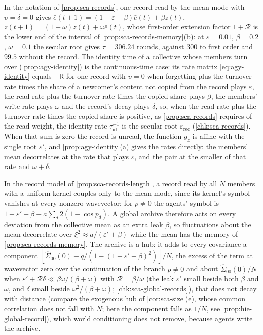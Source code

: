 \begin{remark}\label{rem:sca-records-special}
In the notation of \cref{prop:sca-records}, one record read by the mean mode with $\upsilon=\delta=0$ gives $\bar e(t+1)=(1-\varepsilon-\beta)\bar e(t)+\beta z(t)$, $z(t+1)=(1-\omega)z(t)+\omega\bar e(t)$, whose first-order extension factor $1+\mathcal R$ is the lower end of the interval of \cref{prop:sca-records-memory}(b): at $\varepsilon=0.01$, $\beta=0.2$, $\omega=0.1$ the secular root gives $\tau=306.24$ rounds, against $300$ to first order and $99.5$ without the record. The identity time of a collective whose members turn over (\cref{prop:agy-identity}) is the continuous-time case: its rate matrix \eqref{eq:agy-identity} equals $-\mathsf R$ for one record with $\upsilon=0$ when forgetting plus the turnover rate times the share of a newcomer's content not copied from the record plays $\varepsilon$, the read rate plus the turnover rate times the copied share plays $\beta$, the members' write rate plays $\omega$ and the record's decay plays $\delta$, so, when the read rate plus the turnover rate times the copied share is positive, as \cref{prop:sca-records} requires of the read weight, the identity rate $\tau_{\mathrm{id}}^{-1}$ is the secular root $\varepsilon_{\mathrm{rec}}$ (\cref{chk:sca-records}). When that sum is zero the record is unread, the function $g_z$ is affine with the single root $\varepsilon'$, and \cref{prop:agy-identity}(a) gives the rates directly: the members' mean decorrelates at the rate that plays $\varepsilon$, and the pair at the smaller of that rate and $\omega+\delta$.
\end{remark}

\begin{remark}\label{rem:sca-global-records}
In the record model of \cref{prop:sca-records-length}, a record read by all $N$ members with a uniform kernel couples only to the mean mode, since its kernel's symbol vanishes at every nonzero wavevector; for $p\neq0$ the agents' symbol is $1-\varepsilon'-\beta-a\sum_d2(1-\cos p_d)$. A global archive therefore acts on every deviation from the collective mean as an extra leak $\beta$, so fluctuations about the mean decorrelate over $\xi^2\approx a/(\varepsilon'+\beta)$ while the mean has the memory of \cref{prop:sca-records-memory}. The archive is a hub: it adds to every covariance a component $[\hat\Sigma_{00}(0)-q/(1-(1-\varepsilon'-\beta)^2)]/N$, the excess of the term at wavevector zero over the continuation of the branch $p\neq0$ and about $\hat\Sigma_{00}(0)/N$ when $\varepsilon'+\mathcal R\delta\ll\beta\omega/(\beta+\omega)$ with $\mathcal R=\beta/\omega$ (the leak $\varepsilon'$ small beside both $\beta$ and $\omega$, and $\delta$ small beside $\omega^2/(\beta+\omega)$; \cref{chk:sca-global-records}), that does not decay with distance (compare the exogenous hub of \cref{cor:sca-size}(e), whose common correlation does not fall with $N$; here the component falls as $1/N$, see \cref{prop:hie-global-record}), which world conditioning does not remove, because agents write the archive.
\end{remark}

